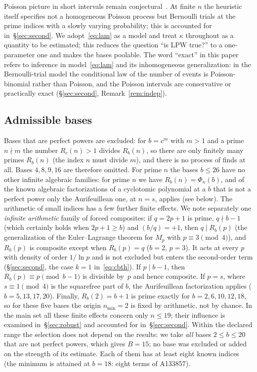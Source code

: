 \documentclass[11pt,a4paper]{article}
\theoremstyle{plain}
\theoremstyle{remark}
\newcommand{\Rb}{R_b}
\begin{document}
Poisson picture in short intervals remain conjectural~\cite{jha2026}. At finite
$n$ the heuristic itself specifies not a homogeneous Poisson process but
Bernoulli trials at the prime indices with a slowly varying probability; this is
accounted for in~\S\ref{sec:second}. We adopt~\eqref{eq:lam}
as a model and treat $\kappa$ throughout as a quantity to be estimated; this
reduces the question ``is LPW true?'' to a one-parameter one and makes the bases
poolable. The word ``exact'' in this paper refers to inference in
model~\eqref{eq:lam} and its inhomogeneous generalization: in the Bernoulli-trial
model the conditional law of the number of events is Poisson-binomial rather than
Poisson, and the Poisson intervals are conservative or practically exact
(\S\ref{sec:second}, Remark~\ref{rem:indep}).

\subsection{Admissible bases}\label{sec:bases}
Bases that are perfect powers are excluded: for $b=c^{m}$ with $m>1$ and a prime
$n\nmid m$ the number $R_c(n)>1$ divides $\Rb(n)$, so there are only finitely many
primes $\Rb(n)$ (the index $n$ must divide $m$), and there is no process of finds
at all. Bases $4,8,9,16$ are therefore omitted. For prime $n$ the bases $b\le26$
have no other infinite algebraic families: for prime $n$ we have
$\Rb(n)=\Phi_n(b)$, and of the known algebraic factorizations of a cyclotomic
polynomial at a $b$ that is not a perfect power only the Aurifeuillean one, at
$n=s$, applies (see below). The arithmetic of small indices has a few further finite
effects. We note separately one \emph{infinite arithmetic} family of forced
composites: if $q=2p+1$ is prime, $q\nmid b-1$ (which certainly holds when
$2p+1\ge b$) and $(b/q)=+1$, then $q\mid\Rb(p)$ (the
generalization of the Euler--Lagrange theorem for $M_p$ with $p\equiv3\pmod4$),
and $\Rb(p)$ is composite except when $\Rb(p)=q$ ($b=2$, $p=3$).
It acts at every $p$ with density of order $1/\ln p$ and is not excluded but
enters the second-order term (\S\ref{sec:second}, the case $k=1$
in~\eqref{eq:cbth}). If $p\mid b-1$, then $\Rb(p)\equiv p\pmod{b-1}$ is divisible
by~$p$ and hence composite. If $p=s$, where $s\equiv1\pmod4$ is the squarefree
part of $b$, the Aurifeuillean factorization applies ($b=5,13,17,20$). Finally,
$\Rb(2)=b+1$ is prime exactly for $b=2,6,10,12,18$, so for these five bases the
origin $n_{\min}=2$ is fixed by arithmetic, not by chance. In the main set all
these finite effects concern only $n\le19$; their influence is examined in~\S\ref{sec:robust} and
accounted for in~\S\ref{sec:second}. Within the declared range
the selection does not depend on the results: we take \emph{all} bases
$2\le b\le20$ that are not perfect powers, which gives $B=15$; no base was
excluded or added on the strength of its estimate. Each of them has at least
eight known indices (the minimum is attained at $b=18$: eight terms of A133857).
\end{document}
